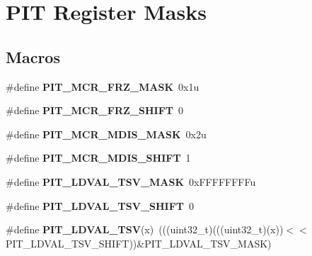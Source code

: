 \hypertarget{group__PIT__Register__Masks}{}\section{P\+IT Register Masks}
\label{group__PIT__Register__Masks}
\subsection*{Macros}
\begin{DoxyCompactItemize}
\item 
\#define {\bfseries P\+I\+T\+\_\+\+M\+C\+R\+\_\+\+F\+R\+Z\+\_\+\+M\+A\+SK}~0x1u\hypertarget{group__PIT__Register__Masks_ga8149a0bb21843632dd4528b540480ba7}{}\label{group__PIT__Register__Masks_ga8149a0bb21843632dd4528b540480ba7}

\item 
\#define {\bfseries P\+I\+T\+\_\+\+M\+C\+R\+\_\+\+F\+R\+Z\+\_\+\+S\+H\+I\+FT}~0\hypertarget{group__PIT__Register__Masks_ga500ccd29eaebc20aa853e7bbb23e3c0c}{}\label{group__PIT__Register__Masks_ga500ccd29eaebc20aa853e7bbb23e3c0c}

\item 
\#define {\bfseries P\+I\+T\+\_\+\+M\+C\+R\+\_\+\+M\+D\+I\+S\+\_\+\+M\+A\+SK}~0x2u\hypertarget{group__PIT__Register__Masks_ga024258b2c23ff75f3e161e56adbbe733}{}\label{group__PIT__Register__Masks_ga024258b2c23ff75f3e161e56adbbe733}

\item 
\#define {\bfseries P\+I\+T\+\_\+\+M\+C\+R\+\_\+\+M\+D\+I\+S\+\_\+\+S\+H\+I\+FT}~1\hypertarget{group__PIT__Register__Masks_ga7ddcd16550ff71e4ee5ac48022ae6fb6}{}\label{group__PIT__Register__Masks_ga7ddcd16550ff71e4ee5ac48022ae6fb6}

\item 
\#define {\bfseries P\+I\+T\+\_\+\+L\+D\+V\+A\+L\+\_\+\+T\+S\+V\+\_\+\+M\+A\+SK}~0x\+F\+F\+F\+F\+F\+F\+F\+Fu\hypertarget{group__PIT__Register__Masks_gab7929b3b8a0c170a50f57d97face5365}{}\label{group__PIT__Register__Masks_gab7929b3b8a0c170a50f57d97face5365}

\item 
\#define {\bfseries P\+I\+T\+\_\+\+L\+D\+V\+A\+L\+\_\+\+T\+S\+V\+\_\+\+S\+H\+I\+FT}~0\hypertarget{group__PIT__Register__Masks_ga463855d2b42de901bad9bea868f4f48b}{}\label{group__PIT__Register__Masks_ga463855d2b42de901bad9bea868f4f48b}

\item 
\#define {\bfseries P\+I\+T\+\_\+\+L\+D\+V\+A\+L\+\_\+\+T\+SV}(x)~(((uint32\+\_\+t)(((uint32\+\_\+t)(x))$<$$<$P\+I\+T\+\_\+\+L\+D\+V\+A\+L\+\_\+\+T\+S\+V\+\_\+\+S\+H\+I\+FT))\&P\+I\+T\+\_\+\+L\+D\+V\+A\+L\+\_\+\+T\+S\+V\+\_\+\+M\+A\+SK)\hypertarget{group__PIT__Register__Masks_ga1aa1b498b2c8f1a14d095370a7ddf9a6}{}\label{group__PIT__Register__Masks_ga1aa1b498b2c8f1a14d095370a7ddf9a6}


\end{DoxyCompactItemize}
